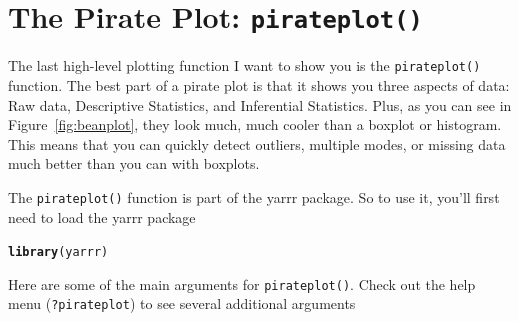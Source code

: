 \documentclass{tufte-book}\usepackage[]{graphicx}\usepackage[]{color}
\makeatletter
\newcommand{\hlstd}[1]{\textcolor[rgb]{0.345,0.345,0.345}{#1}}%
\newcommand{\hlkwd}[1]{\textcolor[rgb]{0.737,0.353,0.396}{\textbf{#1}}}%
\newenvironment{kframe}{%
 \def\at@end@of@kframe{}%
 \ifinner\ifhmode%
  \def\at@end@of@kframe{\end{minipage}}%
  \begin{minipage}{\columnwidth}%
 \fi\fi%
 \def\FrameCommand##1{\hskip\@totalleftmargin \hskip-\fboxsep
 \colorbox{shadecolor}{##1}\hskip-\fboxsep
     \hskip-\linewidth \hskip-\@totalleftmargin \hskip\columnwidth}%
 \MakeFramed {\advance\hsize-\width
   \@totalleftmargin\z@ \linewidth\hsize
   \@setminipage}}%
 {\par\unskip\endMakeFramed%
 \at@end@of@kframe}
\newenvironment{knitrout}{}{} %
\makeatother
\begin{document}
\section{The Pirate Plot: \texttt{pirateplot()}}

The last high-level plotting function I want to show you is the \texttt{pirateplot()} function. The best part of a pirate plot is that it shows you three aspects of data: Raw data, Descriptive Statistics, and Inferential Statistics. Plus, as you can see in Figure~\ref{fig:beanplot}, they look much, much cooler than a boxplot or histogram. This means that you can quickly detect outliers, multiple modes, or missing data much better than you can with boxplots.

The \texttt{pirateplot()} function is part of the yarrr package. So to use it, you'll first need to load the yarrr package

\begin{footnotesize}
\begin{knitrout}
\color{fgcolor}\begin{kframe}
\begin{alltt}
\hlkwd{library}\hlstd{(yarrr)}
\end{alltt}
\end{kframe}
\end{knitrout}
\end{footnotesize}

Here are some of the main arguments for \texttt{pirateplot()}. Check out the help menu (\texttt{?pirateplot}) to see several additional arguments
\end{document}

